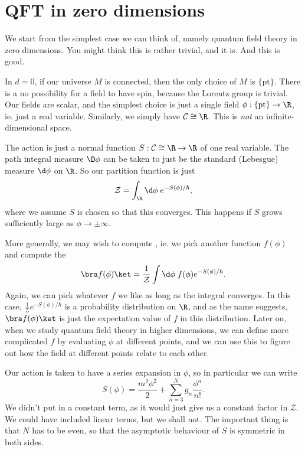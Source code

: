 \documentclass[a4paper]{article}
\begin{document}
\section{QFT in zero dimensions}
We start from the simplest case we can think of, namely quantum field theory in zero dimensions. You might think this is rather trivial, and it is. And this is good.

In $d = 0$, if our universe $M$ is connected, then the only choice of $M$ is $\{\mathrm{pt}\}$. There is a no possibility for a field to have spin, because the Lorentz group is trivial. Our fields are scalar, and the simplest choice is just a single field $\phi: \{\mathrm{pt}\} \to \R$, ie. just a real variable. Similarly, we simply have $\mathcal{C} \cong \R$. This is \emph{not} an infinite-dimensional space.

The action is just a normal function $S: \mathcal{C} \cong \R \to \R$ of one real variable. The path integral measure $\D \phi$ can be taken to just be the standard (Lebesgue) measure $\d \phi$ on $\R$. So our partition function is just
\[
  \mathcal{Z} = \int_\R \d \phi\; e^{-S(\phi)/\hbar},
\]
where we assume $S$ is chosen so that this converges. This happens if $S$ grows sufficiently large as $\phi \to \pm \infty$.

More generally, we may wish to compute , ie. we pick another function $f(\phi)$ and compute the 
\[
  \bra f(\phi)\ket = \frac{1}{\mathcal{Z}} \int \d \phi\; f(\phi) e^{-S(\phi)/\hbar}.
\]
Again, we can pick whatever $f$ we like as long as the integral converges. In this case, $\frac{1}{\mathcal{Z}} e^{-S(\phi)/\hbar}$ is a probability distribution on $\R$, and as the name suggests, $\bra f(\phi)\ket$ is just the expectation value of $f$ in this distribution. Later on, when we study quantum field theory in higher dimensions, we can define more complicated $f$ by evaluating $\phi$ at different points, and we can use this to figure out how the field at different points relate to each other.

Our action is taken to have a series expansion in $\phi$, so in particular we can write
\[
  S(\phi) = \frac{m^2 \phi^2}{2} + \sum_{n = 3}^N g_n \frac{\phi^n}{n!}.
\]
We didn't put in a constant term, as it would just give us a constant factor in $\mathcal{Z}$. We could have included linear terms, but we shall not. The important thing is that $N$ has to be even, so that the asymptotic behaviour of $S$ is symmetric in both sides.
\end{document}
